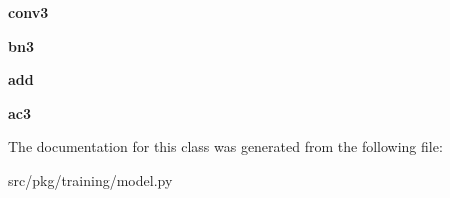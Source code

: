\begin{DoxyCompactItemize}
{\bfseries conv3}
\item 
\mbox{\label{classrnb-planning_1_1src_1_1pkg_1_1training_1_1model_1_1_identity_block_a367cc5eac825674208b0061b8086ba02}} 
{\bfseries bn3}
\item 
\mbox{\label{classrnb-planning_1_1src_1_1pkg_1_1training_1_1model_1_1_identity_block_a685c36b77cc563d3f6f27dbd06fbb981}} 
{\bfseries add}
\item 
\mbox{\label{classrnb-planning_1_1src_1_1pkg_1_1training_1_1model_1_1_identity_block_a043901ccf0c410b2dc899d741503300f}} 
{\bfseries ac3}
\end{DoxyCompactItemize}


The documentation for this class was generated from the following file\+:\begin{DoxyCompactItemize}
\item 
src/pkg/training/model.\+py\end{DoxyCompactItemize}
